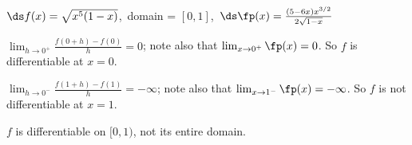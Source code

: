 {$\ds f(x) = \sqrt{x^5(1-x)}$,\ domain = $[0,1]$,\ $\ds\fp(x) = \frac{(5-6x)x^{3/2}}{2\sqrt{1-x}}$
}
{$\lim_{h\to0^+}\frac{f(0+h)-f(0)}h	=0$; note also that $\lim_{x\to0^+}\fp(x) = 0$. So $f$ is differentiable at $x=0$.

$\lim_{h\to0^-}\frac{f(1+h)-f(1)}h	=-\infty$; note also that $\lim_{x\to1^-}\fp(x) = -\infty$. So $f$ is not differentiable at $x=1$.

$f$ is differentiable on $[0,1)$, not its entire domain.
}
